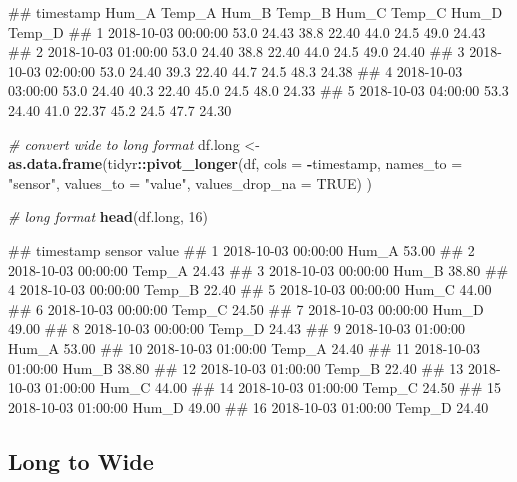 \documentclass[
]{book}
\newenvironment{Shaded}{\begin{snugshade}}{\end{snugshade}}
\newcommand{\CommentTok}[1]{\textcolor[rgb]{0.56,0.35,0.01}{\textit{#1}}}
\newcommand{\DataTypeTok}[1]{\textcolor[rgb]{0.13,0.29,0.53}{#1}}
\newcommand{\DecValTok}[1]{\textcolor[rgb]{0.00,0.00,0.81}{#1}}
\newcommand{\KeywordTok}[1]{\textcolor[rgb]{0.13,0.29,0.53}{\textbf{#1}}}
\newcommand{\NormalTok}[1]{#1}
\newcommand{\OperatorTok}[1]{\textcolor[rgb]{0.81,0.36,0.00}{\textbf{#1}}}
\newcommand{\OtherTok}[1]{\textcolor[rgb]{0.56,0.35,0.01}{#1}}
\newcommand{\StringTok}[1]{\textcolor[rgb]{0.31,0.60,0.02}{#1}}
\let\oldShaded\Shaded
\let\endoldShaded\endShaded
\renewenvironment{Shaded}{\footnotesize\oldShaded}{\endoldShaded}
\let\oldverbatim\verbatim
\let\endoldverbatim\endverbatim
\renewenvironment{verbatim}{\footnotesize\oldverbatim}{\endoldverbatim}
\begin{document}
\begin{verbatim}
##             timestamp Hum_A Temp_A Hum_B Temp_B Hum_C Temp_C Hum_D Temp_D
## 1 2018-10-03 00:00:00  53.0  24.43  38.8  22.40  44.0   24.5  49.0  24.43
## 2 2018-10-03 01:00:00  53.0  24.40  38.8  22.40  44.0   24.5  49.0  24.40
## 3 2018-10-03 02:00:00  53.0  24.40  39.3  22.40  44.7   24.5  48.3  24.38
## 4 2018-10-03 03:00:00  53.0  24.40  40.3  22.40  45.0   24.5  48.0  24.33
## 5 2018-10-03 04:00:00  53.3  24.40  41.0  22.37  45.2   24.5  47.7  24.30
\end{verbatim}

\begin{Shaded}
\begin{Highlighting}[]
\CommentTok{# convert wide to long format}
\NormalTok{df.long <-}\StringTok{ }\KeywordTok{as.data.frame}\NormalTok{(tidyr}\OperatorTok{::}\KeywordTok{pivot_longer}\NormalTok{(df,}
                                             \DataTypeTok{cols =} \OperatorTok{-}\NormalTok{timestamp,}
                                             \DataTypeTok{names_to =} \StringTok{"sensor"}\NormalTok{,}
                                             \DataTypeTok{values_to =} \StringTok{"value"}\NormalTok{,}
                                             \DataTypeTok{values_drop_na =} \OtherTok{TRUE}\NormalTok{)}
\NormalTok{                         )}

\CommentTok{# long format}
\KeywordTok{head}\NormalTok{(df.long, }\DecValTok{16}\NormalTok{)}
\end{Highlighting}
\end{Shaded}

\begin{verbatim}
##              timestamp sensor value
## 1  2018-10-03 00:00:00  Hum_A 53.00
## 2  2018-10-03 00:00:00 Temp_A 24.43
## 3  2018-10-03 00:00:00  Hum_B 38.80
## 4  2018-10-03 00:00:00 Temp_B 22.40
## 5  2018-10-03 00:00:00  Hum_C 44.00
## 6  2018-10-03 00:00:00 Temp_C 24.50
## 7  2018-10-03 00:00:00  Hum_D 49.00
## 8  2018-10-03 00:00:00 Temp_D 24.43
## 9  2018-10-03 01:00:00  Hum_A 53.00
## 10 2018-10-03 01:00:00 Temp_A 24.40
## 11 2018-10-03 01:00:00  Hum_B 38.80
## 12 2018-10-03 01:00:00 Temp_B 22.40
## 13 2018-10-03 01:00:00  Hum_C 44.00
## 14 2018-10-03 01:00:00 Temp_C 24.50
## 15 2018-10-03 01:00:00  Hum_D 49.00
## 16 2018-10-03 01:00:00 Temp_D 24.40
\end{verbatim}

\hypertarget{long-to-wide}{%
\subsection{Long to Wide}\label{long-to-wide}}
\end{document}
